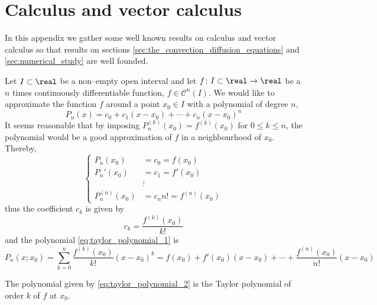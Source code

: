 
\section{Calculus and vector calculus}

In this appendix we gather some well known results on calculus and vector
calculus so that results on sections
\ref{sec:the_convection_diffusion_equations} and \ref{sec:numerical_study} are
well founded.

Let $I \subset \real$ be a non--empty open interval and let $f \colon I \subset
\real \to \real$ be a $n$ times continuously differentiable function, \ie $f \in
\mathcal{C}^n(I)$. We would like to approximate the function $f$ around a point
$x_0 \in I$ with a polynomial of degree $n$,
\begin{equation} \label{eq:taylor_polynomial_1}
    P_n(x) = c_0 + c_1 (x - x_0) + \cdots + c_n (x - x_0)^n
\end{equation}
It seems reasonable that by imposing $P_n^{(k)}(x_0) = f^{(k)}(x_0)$ for $0 \leq
k \leq n$, the polynomial would be a good approximation of $f$ in a
neighbourhood of $x_0$. Thereby,
\begin{equation}
    \left\{
        \begin{aligned}
            P_n(x_0) &= c_0 = f(x_0) \\
            P_n'(x_0) &= c_1 = f'(x_0) \\
            &\vdots \\
            P_n^{(n)}(x_0) &= c_n n! = f^{(n)}(x_0)
         \end{aligned}
    \right.
\end{equation}
thus the coefficient $c_k$ is given by
\begin{equation}
    c_k = \frac{f^{(k)}(x_0)}{k!}
\end{equation}
and the polynomial \eqref{eq:taylor_polynomial_1} is
\begin{equation} \label{eq:taylor_polynomial_2}
    P_n(x;x_0) = 
    \sum_{k=0}^n \frac{f^{(k)}(x_0)}{k!} (x - x_0)^k = 
    f(x_0) + f'(x_0) (x - x_0) + \cdots + \frac{f^{(n)}(x_0)}{n!} (x - x_0)
\end{equation}

\begin{definition}
    The polynomial given by \eqref{eq:taylor_polynomial_2} is the Taylor
    polynomial of order $k$ of $f$ at $x_0$.
\end{definition}

\begin{theorem}
	
\end{theorem}

\begin{theorem}
	
\end{theorem}